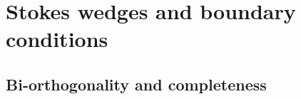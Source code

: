 \documentclass[12pt, a4paper]{report}
\newcommand\PT{\(\mathcal{PT}\)}
\newcommand\CC{\(\mathcal{C}\)}
\begin{document}


\section*{Stokes wedges and boundary conditions}\label{AppBCS}



\subsection*{Bi-orthogonality and completeness}\label{AppBiorth}


\end{document}
